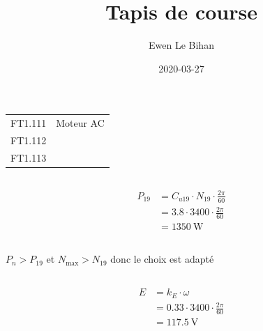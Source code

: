 \documentclass{article}
\title{Tapis de course}
\author{Ewen Le Bihan}
\date{2020-03-27}
\begin{document}
\maketitle

\section{}

\subsection{}

\begin{table}[h]
  \centering
  \begin{tabular}{ll}
    FT1.111 & Moteur AC \\
    FT1.112 & \\
    FT1.113 &
  \end{tabular}
\end{table}

\subsection{}

\begin{equation*}
  \begin{split}
    P_{19} &= C_{u19} \cdot N_{19} \cdot \frac{2\pi}{60} \\
           &= 3.8 \cdot 3400 \cdot \frac{2\pi}{60} \\
           &= \SI{1350}{\watt}
  \end{split}
\end{equation*}

\subsection{}

$P_n > P_{19}$ et $N_{\text{max}} > N_{19}$ donc le choix est adapté

\subsection{}

\begin{equation*}
  \begin{split}
    E &= k_E \cdot \omega \\
    &= 0.33 \cdot 3400 \cdot \frac{2\pi}{60} \\
    &= \SI{117.5}{\volt}
  \end{split}
\end{equation*}
\end{document}
